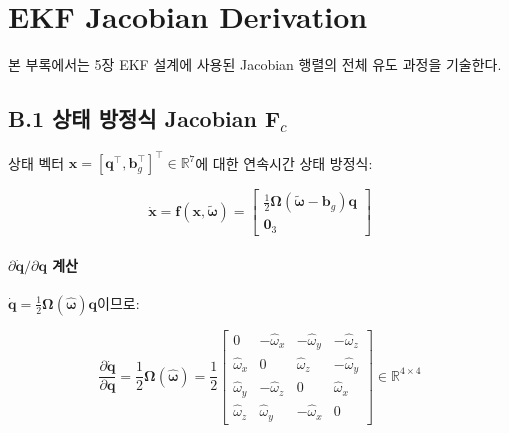 \section{EKF Jacobian Derivation}
\label{app:jacobian}
 
본 부록에서는 5장 EKF 설계에 사용된 Jacobian 행렬의
전체 유도 과정을 기술한다.
 
\subsection*{B.1 상태 방정식 Jacobian $\mathbf{F}_c$}
 
상태 벡터 $\mathbf{x} = [\mathbf{q}^\top, \mathbf{b}_g^\top]^\top \in \mathbb{R}^7$에 대한
연속시간 상태 방정식:
 
\begin{equation}
    \dot{\mathbf{x}} = \mathbf{f}(\mathbf{x}, \tilde{\boldsymbol{\omega}}) =
    \begin{bmatrix}
        \frac{1}{2}\boldsymbol{\Omega}(\tilde{\boldsymbol{\omega}} - \mathbf{b}_g)\mathbf{q} \\
        \mathbf{0}_3
    \end{bmatrix}
    \tag{B.1}
\end{equation}
 
\paragraph{$\partial \dot{\mathbf{q}} / \partial \mathbf{q}$ 계산}
 
$\dot{\mathbf{q}} = \frac{1}{2}\boldsymbol{\Omega}(\hat{\boldsymbol{\omega}})\mathbf{q}$이므로:
 
\begin{equation}
    \frac{\partial \dot{\mathbf{q}}}{\partial \mathbf{q}} =
    \frac{1}{2}\boldsymbol{\Omega}(\hat{\boldsymbol{\omega}}) =
    \frac{1}{2}\begin{bmatrix}
         0       & -\hat{\omega}_x & -\hat{\omega}_y & -\hat{\omega}_z \\
         \hat{\omega}_x &  0        &  \hat{\omega}_z & -\hat{\omega}_y \\
         \hat{\omega}_y & -\hat{\omega}_z &  0        &  \hat{\omega}_x \\
         \hat{\omega}_z &  \hat{\omega}_y & -\hat{\omega}_x &  0
    \end{bmatrix}
    \in \mathbb{R}^{4\times 4}
    \tag{B.2}
\end{equation}
 
